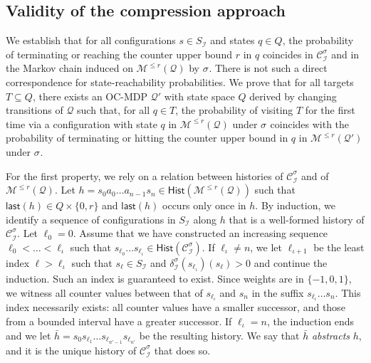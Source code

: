 \documentclass[a4paper,UKenglish,cleveref,autoref,thm-restate,colorlinks]{lipics-v2021}
\newcommand{\mdp}{\mathcal{M}}
\newcommand{\mdpStateSpace}{S}
\newcommand{\mdpTrans}{\delta}
\newcommand{\histSet}[1]{\mathsf{Hist}(#1)}
\newcommand{\hist}{h}
\newcommand{\last}[1]{\mathsf{last}(#1)}
\newcommand{\indexPosition}{\ell}
\newcommand{\subindexPosition}{\iota}
\newcommand{\indexLast}{n}
\newcommand{\ocmdp}{\mathcal{Q}}
\newcommand{\ocmdpFin}[2]{\mdp^{\leq #2}(#1)}
\newcommand{\ocStateSpace}{Q}
\newcommand{\ocState}{q}
\newcommand{\ocConfig}{s}
\newcommand{\ocAction}{a}
\newcommand{\counterUB}{r}
\newcommand{\mchain}{\mathcal{C}}
\newcommand{\intPart}{\mathcal{I}}
\newcommand{\compressChainStrat}[1]{\mchain^{#1}_{\intPart}}
\newcommand{\compressChain}{\compressChainStrat{\strat}}
\newcommand{\compressChainStateSpace}{\mdpStateSpace_{\intPart}}
\newcommand{\compressChainTransTemplate}[2]{\mdpTrans^{#1}_{#2}}
\newcommand{\compressChainTrans}{\compressChainTransTemplate{\strat}{\intPart}}
\newcommand{\mcHist}{\bar{\hist}}
\newcommand{\target}{T}
\newcommand{\stratGeneric}[1]{{\sigma_{#1}}}
\newcommand{\strat}{\stratGeneric{}}
\begin{document}
\subsection{Validity of the compression approach}\label{section:abstraction:validation}

We establish that for all configurations $\ocConfig\in\compressChainStateSpace$ and states $\ocState\in\ocStateSpace$, the probability of terminating or reaching the counter upper bound $\counterUB$ in $\ocState$ coincides in $\compressChain$ and in the Markov chain induced on $\ocmdpFin{\ocmdp}{\counterUB}$ by $\strat$.
There is not such a direct correspondence for state-reachability probabilities.
We prove that for all targets $\target\subseteq\ocStateSpace$, there exists an OC-MDP $\ocmdp'$ with state space $\ocStateSpace$ derived by changing transitions of $\ocmdp$ such that, for all $\ocState\in\target$, the probability of visiting $\target$ for the first time via a configuration with state $\ocState$ in $\ocmdpFin{\ocmdp}{\counterUB}$ under $\strat$ coincides with the probability of terminating or hitting the counter upper bound in $\ocState$ in $\ocmdpFin{\ocmdp'}{\counterUB}$ under $\strat$.


For the first property, we rely on a relation between histories of $\compressChain$ and of $\ocmdpFin{\ocmdp}{\counterUB}$.
Let $\hist = \ocConfig_0\ocAction_0\ldots\ocAction_{\indexLast-1}\ocConfig_\indexLast\in\histSet{\ocmdpFin{\ocmdp}{\counterUB}}$ such that $\last{\hist}\in\ocStateSpace\times\{0, \counterUB\}$ and $\last{\hist}$ occurs only once in $\hist$.
By induction, we identify a sequence of configurations in $\compressChainStateSpace$ along $\hist$ that is a well-formed history of $\compressChain$.
Let $\indexPosition_0 = 0$.
Assume that we have constructed an increasing sequence $\indexPosition_0 <\ldots < \indexPosition_\subindexPosition$ such that $\ocConfig_{\indexPosition_0}\ldots\ocConfig_{\indexPosition_\subindexPosition}\in\histSet{\compressChain}$.
If $\indexPosition_\subindexPosition\neq\indexLast$, we let $\indexPosition_{\subindexPosition+1}$ be the least index $\indexPosition > \indexPosition_{\subindexPosition}$ such that $\ocConfig_\indexPosition\in\compressChainStateSpace$ and  $\compressChainTrans(\ocConfig_{\indexPosition_{\subindexPosition}})(\ocConfig_{\indexPosition}) > 0$ and continue the induction.
Such an index is guaranteed to exist.
Since weights are in $\{-1, 0, 1\}$, we witness all counter values between that of $\ocConfig_{\indexPosition_\subindexPosition}$ and $\ocConfig_\indexLast$ in the suffix $\ocConfig_{\indexPosition_\subindexPosition}\ldots\ocConfig_\indexLast$.
This index necessarily exists: all counter values have a smaller successor, and those from a bounded interval have a greater successor.
If $\indexPosition_{\subindexPosition}=\indexLast$, the induction ends and we let $\mcHist = \ocConfig_0\ocConfig_{\indexPosition_1}\ldots\ocConfig_{\indexPosition_{\indexLast'-1}}\ocConfig_{\indexPosition_{\indexLast'}}$ be the resulting history.
We say that $\mcHist$ \textit{abstracts} $\hist$, and it is the unique history of $\compressChain$ that does so.
\end{document}
